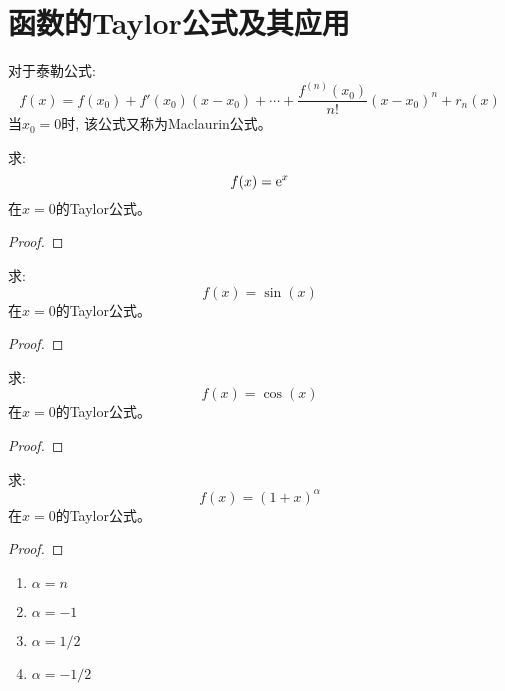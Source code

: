 \section{函数的Taylor公式及其应用}
对于泰勒公式:
\begin{equation*}
    f(x) = f(x_0) + f'(x_0)(x - x_0) + \cdots + \frac{f^{(n)}(x_0)}{n!}(x-x_0)^n + r_n(x)
\end{equation*}
当$x_0 = 0$时, 该公式又称为Maclaurin公式。

\begin{example}
    求:
    \begin{equation*}
        f(x) = \mathrm{e}^x
    \end{equation*}
    在$x = 0$的Taylor公式。
\end{example}
\begin{proof}
    
\end{proof}

\begin{example}
    求:
    \begin{equation*}
        f(x) = \sin(x)
    \end{equation*}
    在$x = 0$的Taylor公式。
\end{example}
\begin{proof}
    
\end{proof}

\begin{example}
    求:
    \begin{equation*}
        f(x) = \cos(x)
    \end{equation*}
    在$x = 0$的Taylor公式。
\end{example}
\begin{proof}
    
\end{proof}

\begin{example}
    求:
    \begin{equation*}
        f(x) =(1+x)^\alpha
    \end{equation*}
    在$x = 0$的Taylor公式。
\end{example}
\begin{proof}
    
\end{proof}
\begin{remark}
    \begin{enumerate}
        \item $\alpha = n$
        \item $\alpha = -1$
        \item $\alpha = 1/2$
        \item $\alpha = -1/2$
    \end{enumerate}
\end{remark}

